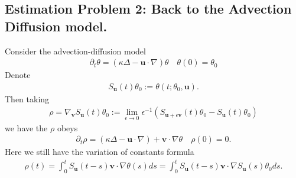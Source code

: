 \documentclass[twoside]{article}
\numberwithin{equation}{section}
\newcommand{\CC}{\mathbb{C}}
\newcommand{\bfU}{\mathbf{u}}
\newcommand{\bfV}{\mathbf{v}}
\begin{document}
\subsection{Estimation Problem 2: Back to the Advection Diffusion model.} 

Consider the advection-diffusion model
\begin{align}
	\partial_t \theta = (\kappa \Delta- \bfU \cdot \nabla) \theta \quad \theta(0) = \theta_0
\end{align}
Denote
\begin{align}
	S_\bfU(t) \theta_0 := \theta(t; \theta_0, \bfU).
\end{align}
Then taking 
\begin{align}
  \rho =  \nabla_\bfV S_\bfU(t) \theta_0 := \lim_{\epsilon \to 0} \epsilon^{-1} ( S_{\bfU+ \epsilon \bfV}(t) \theta_0 -  S_{\bfU}(t) \theta_0 )
\end{align}
we have the $\rho$ obeys
\begin{align}
\partial_t \rho = (\kappa \Delta- \bfU \cdot \nabla) +  \bfV \cdot \nabla \theta \quad \rho(0) = 0.
\end{align}
Here we still have the variation of constants formula
\begin{align}
	\rho(t) = \int_0^t S_\bfU(t-s) \bfV \cdot \nabla \theta(s) ds =  \int_0^t S_\bfU(t-s) \bfV \cdot \nabla S_\bfU(s) \theta_0 ds.
\end{align}
%






\begin{footnotesize}


\end{footnotesize}
 
\end{document}
